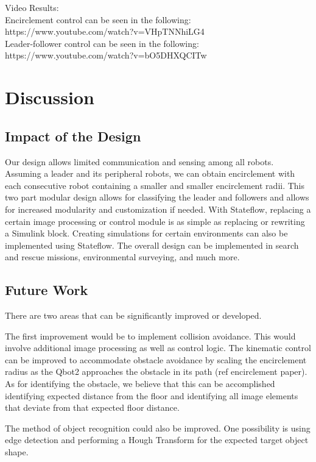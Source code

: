 \documentclass[conference]{IEEEtran}
\begin{document}
\newpage

Video Results:\\
Encirclement control can be seen in the following: \\https://www.youtube.com/watch?v=VHpTNNhiLG4 \\
Leader-follower control can be seen in the following:\\ https://www.youtube.com/watch?v=bO5DHXQCITw




\section{Discussion}

\subsection{Impact of the Design}
Our design allows limited communication and sensing among all robots. Assuming a leader and its peripheral robots, we can obtain encirclement with each consecutive robot containing a smaller and smaller encirclement radii. This two part modular design allows for classifying the leader and followers and allows for increased modularity and customization if needed. With Stateflow, replacing a certain image processing or control module is as simple as replacing or rewriting a Simulink block. Creating simulations for certain environments can also be implemented using Stateflow.
The overall design can be implemented in search and rescue missions, environmental surveying, and much more.

\subsection{Future Work}
There are two areas that can be significantly improved or developed.

The first improvement would be to implement collision avoidance.  This would involve additional image processing as well as control logic.  The kinematic control can be improved to accommodate obstacle avoidance by scaling the encirclement radius as the Qbot2 approaches the obstacle in its path (ref encirclement paper).  As for identifying the obstacle, we believe that this can be accomplished identifying expected distance from the floor and identifying all image elements that deviate from that expected floor distance.  

The method of object recognition could also be improved. One possibility is using edge detection and performing a Hough Transform for the expected target object shape.
\end{document}
